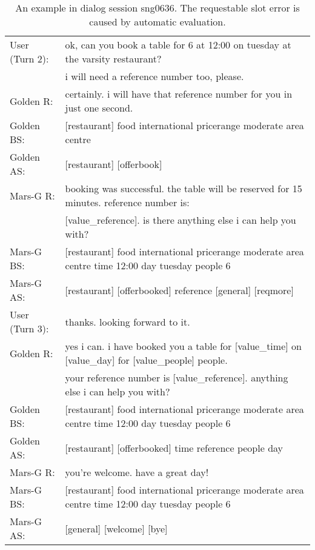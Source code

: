 \begin{table*}[ht]
{\begin{tabular}{ll}
  	\midrule
 User (Turn 2):  & {\color{red}ok, can you book a table for 6 at 12:00 on tuesday at the varsity restaurant?} \\&{\color{red}i will need a reference number too, please.}	\\
  	Golden R: & certainly. i will have that reference number for you in just one second. \\
  	Golden BS: & [restaurant] food international pricerange moderate area centre \\
Golden AS:&    [restaurant] [offerbook]   \\
  	  Mars-G R: &  {\color{red}booking was successful. the table will be reserved for 15 minutes. reference number is:}\\& {\color{red}[value\_reference].} is there anything else i can help you with?\\
  	 Mars-G BS: & [restaurant] food international pricerange moderate area centre time 12:00 day tuesday people 6\\
  Mars-G AS:&     {\color{red}[restaurant] [offerbooked] reference} [general] [reqmore] \\
           
  	 
  	 	\midrule
  	 	User (Turn 3):   &thanks. looking forward to it.\\
  	 	  Golden R: & yes i can. {\color{red}i have booked you a table for [value\_time] on [value\_day] for [value\_people] people.} \\&{\color{red}your reference number is [value\_reference].} anything else i can help you with?\\
  	 	 	Golden BS:  &  [restaurant] food international pricerange moderate area centre time 12:00 day tuesday people 6 \\
  	 	 	Golden AS:&    [restaurant] {\color{red}[offerbooked]} time {\color{red}reference} people day \\
  	 	     Mars-G R: &you're welcome. have a great day!\\
  	 	 Mars-G BS:  &  [restaurant] food international pricerange moderate area centre time 12:00 day tuesday people 6\\
  Mars-G AS:&  [general] [welcome] [bye]    \\
    
		\bottomrule
	\end{tabular}}\caption{An example in dialog session sng0636. The requestable slot error is caused by automatic evaluation. \label{tab:case6}}
\end{table*}

